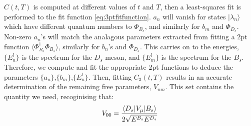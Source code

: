 $C(t,T)$ is computed at different values of $t$ and $T$, then a least-squares fit is performed to the fit function \eqref{eq:3ptfitfunction}. $a_n$ will vanish for states $|\lambda_n\rangle$ which have different quantum numbers to $\Phi_{B_s}$, and similarly for $b_m$ and $\Phi_{D_s}$. Non-zero $a_n$'s will match the analagous parameters extracted from fitting a 2pt function $\langle \Phi_{B_s}^{\dagger} \Phi_{B_s} \rangle$, similarly for $b_n$'s and $\Phi_{D_s}$. This carries on to the energies, $\{E^l_n\}$ is the spectrum for the $D_s$ meson, and $\{E^l_m\}$ is the spectrum for the $B_s$. Therefore, we compute and fit the appropriate 2pt functions to deduce the parameters $\{a_n\}$,$\{b_m\}$,$\{E^l_n\}$. Then, fitting $C_3(t,T)$ results in an accurate determination of the remaining free parameters, $V_{nm}$. This set contains the quantity we need, recoginising that:
\begin{align}
	V_{00} = {\langle D_s | V_{\mu} | B_s \rangle \over 2\sqrt{E^{B_s} E^{D_s} } }
\end{align}




